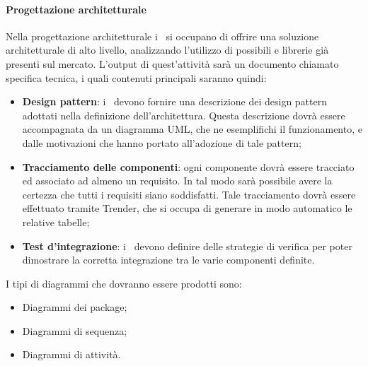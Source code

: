 \documentclass[../NormeDiProgetto_v3.0.0.tex]{subfiles}
\begin{document}
		\paragraph{Progettazione architetturale}
			Nella progettazione architetturale i \progettisti\ si occupano di offrire una soluzione architetturale di alto livello, analizzando l'utilizzo di possibili  e librerie già presenti sul mercato.
			L'output di quest'attività sarà un documento chiamato specifica tecnica, i quali contenuti principali saranno quindi:
			\begin{itemize}
				\item \textbf{Design pattern}: i \progettisti\ devono fornire una descrizione dei design pattern adottati
				nella definizione dell'architettura. Questa descrizione dovrà essere accompagnata da un
				diagramma UML, che ne esemplifichi il funzionamento, e dalle motivazioni che hanno
				portato all'adozione di tale pattern;
				\item \textbf{Tracciamento delle componenti}: ogni componente dovrà essere tracciato ed associato
				ad almeno un requisito. In tal modo sarà possibile avere la certezza che tutti i requisiti
				siano soddisfatti. Tale tracciamento dovrà essere effettuato tramite Trender, che si occupa
				di generare in modo automatico le relative tabelle;
				\item \textbf{Test d'integrazione}: i \progettisti\ devono definire delle strategie di verifica per poter
				dimostrare la corretta integrazione tra le varie componenti definite.
			\end{itemize}

			I tipi di diagrammi che dovranno essere prodotti sono:
			\begin{itemize}
				\item Diagrammi dei package;
				\item Diagrammi di sequenza;
				\item Diagrammi di attività.
			\end{itemize}
\end{document}
